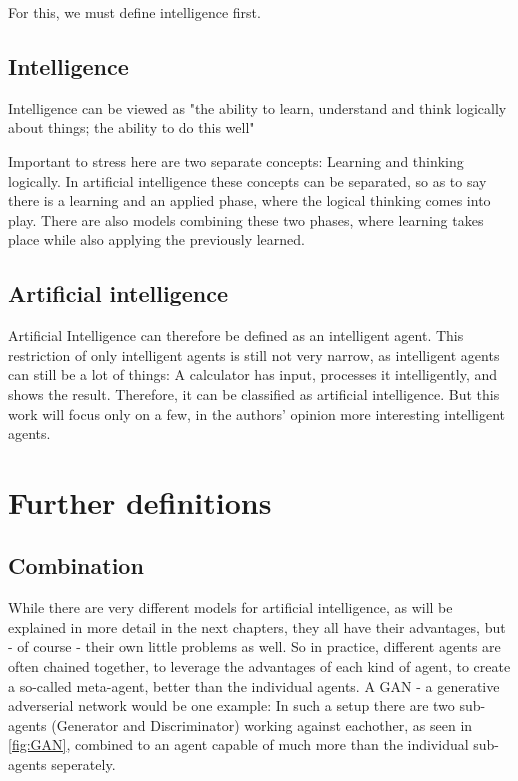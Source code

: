 For this, we must define intelligence first.
\subsection{Intelligence}
Intelligence can be viewed as "the ability to learn, understand and think logically about things; the ability to do this well" 
\cite{intelligence}

Important to stress here are two separate concepts: Learning and thinking logically.
In artificial intelligence these concepts can be separated, so as to say there is a learning and an applied phase, where the logical thinking comes into play. %
There are also models combining these two phases, where learning takes place while also applying the previously learned. 

\subsection{Artificial intelligence}
Artificial Intelligence can therefore be defined as an intelligent agent.
This restriction of only intelligent agents is still not very narrow, as intelligent agents can still be a lot of things: A calculator has input, processes it intelligently, and shows the result. Therefore, it can be classified as artificial intelligence. But this work will focus only on a few, in the authors' opinion more interesting intelligent agents.

\section{Further definitions}
\subsection{Combination}
While there are very different models for artificial intelligence, as will be explained in more detail in the next chapters, they all have their advantages, but - of course - their own little problems as well. So in practice, different agents are often chained together, to leverage the advantages of each kind of agent, to create a so-called meta-agent, better than the individual agents.
A GAN - a generative adverserial network would be one example: In such a setup there are two sub-agents (Generator and Discriminator) working against eachother, as seen in \autoref{fig:GAN}, combined to an agent capable of much more than the individual sub-agents seperately.

